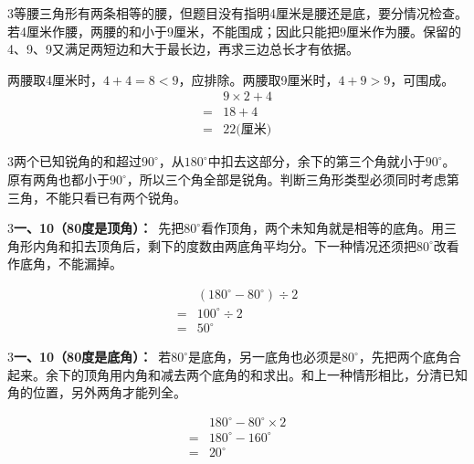 \documentclass[multi=snippet,border={5bp 20bp 5bp 5bp}]{standalone}
\newenvironment{snippet}[3]{\begin{minipage}{#1bp}\color{answerred}\fontsize{#2}{#3}\selectfont\raggedright}{\end{minipage}}
\begin{document}
\begin{snippet}{505}{11.5}{14}\begin{multicols}{3}\raggedcolumns 等腰三角形有两条相等的腰，但题目没有指明4厘米是腰还是底，要分情况检查。若4厘米作腰，两腰的和小于9厘米，不能围成；因此只能把9厘米作为腰。保留的4、9、9又满足两短边和大于最长边，再求三边总长才有依据。\par 两腰取4厘米时，\(4+4=8<9\)\allowbreak ，应排除。两腰取9厘米时，\(4+9>9\)\allowbreak ，可围成。\[\begin{aligned}&9\times2+4\\={}&18+4\\={}&22\text{(厘米)}\end{aligned}\]\end{multicols}\end{snippet}
\begin{snippet}{505}{11.5}{14}\begin{multicols}{3}\raggedcolumns 两个已知锐角的和超过\(90^\circ\)\allowbreak ，从\(180^\circ\)\allowbreak 中扣去这部分，余下的第三个角就小于\(90^\circ\)\allowbreak 。原有两角也都小于\(90^\circ\)\allowbreak ，所以三个角全部是锐角。判断三角形类型必须同时考虑第三角，不能只看已有两个锐角。\end{multicols}\end{snippet}
\begin{snippet}{505}{11.5}{14}\begin{multicols}{3}\raggedcolumns \textbf{一、10（80度是顶角）：}\ 先把\(80^\circ\)\allowbreak 看作顶角，两个未知角就是相等的底角。用三角形内角和扣去顶角后，剩下的度数由两底角平均分。下一种情况还须把\(80^\circ\)\allowbreak 改看作底角，不能漏掉。\par \[\begin{aligned}&(180^\circ-80^\circ)\div2\\={}&100^\circ\div2\\={}&50^\circ\end{aligned}\]\end{multicols}\end{snippet}
\begin{snippet}{505}{11.5}{14}\begin{multicols}{3}\raggedcolumns \textbf{一、10（80度是底角）：}\ 若\(80^\circ\)\allowbreak 是底角，另一底角也必须是\(80^\circ\)\allowbreak ，先把两个底角合起来。余下的顶角用内角和减去两个底角的和求出。和上一种情形相比，分清已知角的位置，另外两角才能列全。\par \[\begin{aligned}&180^\circ-80^\circ\times2\\={}&180^\circ-160^\circ\\={}&20^\circ\end{aligned}\]\end{multicols}\end{snippet}
\end{document}
